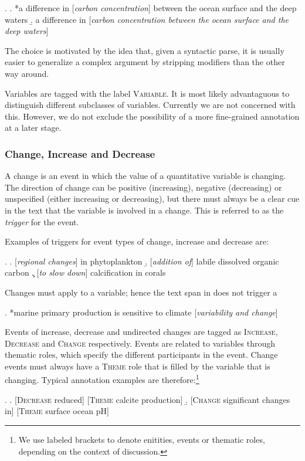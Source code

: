 \documentclass[10pt, a4paper]{article}
\newcommand{\tag}[1]{\textsc{#1}}
\begin{document}
\ex.
  \a. *a difference in [\emph{carbon concentration}] between the ocean surface and the deep waters
  \b. a difference in [\emph{carbon concentration between the ocean surface and the deep waters}]

The choice is motivated by the idea that, given a syntactic parse, it is usually easier to generalize a complex argument by stripping modifiers than the other way around.  

Variables are tagged with the label \tag{Variable}. It is most likely advantaguous to distinguish different subclasses of variables. Currently we are not concerned with this. 
However, we do not exclude the possibility of a more fine-grained annotation at a later stage. 


\subsubsection{Change, Increase and Decrease}

A change is an event in which the value of a quantitative variable is changing.
The direction of change can be positive (increasing), negative (decreasing) or unspecified (either increasing or decreasing), but there must always be a clear cue in the text that the variable is involved in a change.
This is referred to as the \emph{trigger} for the event.

Examples of triggers for event types of change, increase and decrease are:

\ex.
  \a. [\emph{regional changes}] in phytoplankton
  \b. [\emph{addition of}] labile dissolved organic carbon
  \c. [\emph{to slow down}] calcification in corals

Changes must apply to a variable; hence the text span in \Next does not trigger a

\ex. *marine primary production is sensitive to climate [\emph{variability and change}]

Events of increase, decrease and undirected changes are tagged as \tag{Increase}, \tag{Decrease} and \tag{Change} respectively. 
Events are related to variables through thematic roles, which specify the different participants in the event. 
Change events must always have a \tag{Theme} role that is filled by the variable that is changing.
Typical annotation examples are therefore:\footnote{We use labeled brackets to denote enitities, events or thematic roles, depending on the context of discussion.}

\exi.
  \a. [\tag{Decrease} reduced] [\tag{Theme} calcite production]
  \b. [\tag{Change} significant changes in] [\tag{Theme} surface ocean pH]
\end{document}

